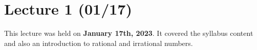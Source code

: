 \chapter{Lecture 1 (01/17)}

This lecture was held on \textbf{January 17th, 2023}. It covered the syllabus content and also an introduction to rational and irrational numbers.
